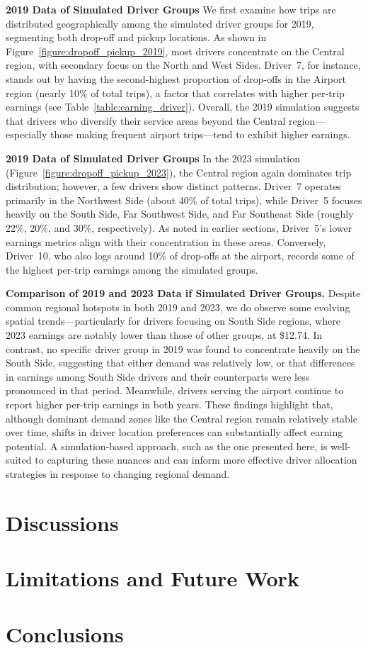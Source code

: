 \textbf{2019 Data of Simulated Driver Groups}  
We first examine how trips are distributed geographically among the simulated driver groups for 2019, segmenting both drop-off and pickup locations. As shown in Figure~\ref{figure:dropoff_pickup_2019}, most drivers concentrate on the Central region, with secondary focus on the North and West Sides. Driver~7, for instance, stands out by having the second-highest proportion of drop-offs in the Airport region (nearly 10\% of total trips), a factor that correlates with higher per-trip earnings (see Table~\ref{table:earning_driver}). Overall, the 2019 simulation suggests that drivers who diversify their service areas beyond the Central region—especially those making frequent airport trips—tend to exhibit higher earnings.

\textbf{2019 Data of Simulated Driver Groups}  
In the 2023 simulation (Figure~\ref{figure:dropoff_pickup_2023}), the Central region again dominates trip distribution; however, a few drivers show distinct patterns. Driver~7 operates primarily in the Northwest Side (about 40\% of total trips), while Driver~5 focuses heavily on the South Side, Far Southwest Side, and Far Southeast Side (roughly 22\%, 20\%, and 30\%, respectively). As noted in earlier sections, Driver~5’s lower earnings metrics align with their concentration in these areas. Conversely, Driver~10, who also logs around 10\% of drop-offs at the airport, records some of the highest per-trip earnings among the simulated groups.

\noindent\textbf{Comparison of 2019 and 2023 Data if Simulated Driver Groups.}  
Despite common regional hotspots in both 2019 and 2023, we do observe some evolving spatial trends—particularly for drivers focusing on South Side regions, where 2023 earnings are notably lower than those of other groups, at \$12.74. In contrast, no specific driver group in 2019 was found to concentrate heavily on the South Side, suggesting that either demand was relatively low, or that differences in earnings among South Side drivers and their counterparts were less pronounced in that period. Meanwhile, drivers serving the airport continue to report higher per-trip earnings in both years. These findings highlight that, although dominant demand zones like the Central region remain relatively stable over time, shifts in driver location preferences can substantially affect earning potential. A simulation-based approach, such as the one presented here, is well-suited to capturing these nuances and can inform more effective driver allocation strategies in response to changing regional demand. 


\section{Discussions}

\section{Limitations and Future Work}

\section{Conclusions}